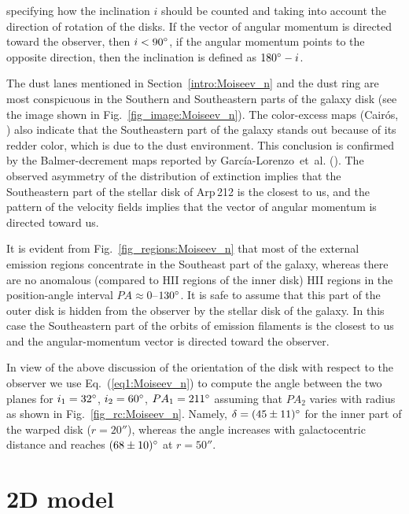\documentclass{ab}
\def\degr{\hbox{$^\circ$}}
\begin{document}
\noindent specifying how the inclination $i$ should be counted and
taking into account the direction of rotation of the disks. If the
vector of angular momentum is directed toward the observer, then
$i<90\degr$, if the angular momentum points to the opposite
direction, then the inclination is defined as $180\degr-i$.

The dust lanes mentioned in Section~\ref{intro:Moiseev_n} and the
dust ring are most conspicuous in the Southern and Southeastern
parts of the galaxy disk (see the image shown in
Fig.~\ref{fig_image:Moiseev_n}). The color-excess maps
(Cair\'{o}s, \cite{cairos2:Moiseev_n}) also indicate that the Southeastern part of the galaxy stands out because of its redder color, which is due
to the dust environment. This conclusion is confirmed by the
Balmer-decrement maps reported by Garc\'{i}a-Lorenzo~et~al. (\cite{cairos3:Moiseev_n}). The observed
asymmetry of the distribution of extinction implies that the
Southeastern part of the stellar disk of Arp\,212 is the closest
to us, and the pattern of the velocity fields implies that the
vector of angular momentum is directed toward us.

It is evident from Fig.~\ref{fig_regions:Moiseev_n} that most of the external emission regions concentrate in the Southeast part of the galaxy, whereas there are no anomalous (compared to HII regions of the
inner disk) HII regions in the  position-angle interval \mbox{$PA\approx0$--$130\degr$}. It is safe to assume
that this part of the outer disk is hidden from the observer by the stellar disk of the galaxy. In this case the Southeastern part of the orbits of emission filaments is the closest to us and the angular-momentum vector is
directed toward the observer.

In view of the above discussion of the orientation of the disk
with respect to the observer we use Eq.~(\ref{eq1:Moiseev_n}) to
compute the angle between the two planes for $i_1=32\degr$,
$i_2=60\degr$, $PA_1=211\degr$ assuming that $PA_2$ varies with
radius as shown in Fig.~\ref{fig_rc:Moiseev_n}. Namely,
\mbox{$\delta=(45\pm11)\degr$} for the inner part of the warped
disk (\mbox{$r=20''$}), whereas the angle increases with
galactocentric distance and reaches $(68\pm10)\degr$ at $r=50''$.

\section{2D model}
\label{2D:Moiseev_n}
\end{document}
